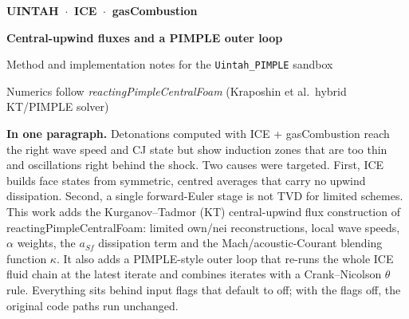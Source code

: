 \documentclass[11pt]{article}
\begin{document}
\thispagestyle{empty}
\vspace*{-6mm}
\begingroup\color{white}\sffamily\raggedright
  {\small\bfseries UINTAH \,$\cdot$\, ICE \,$\cdot$\, gasCombustion\par}
  \vspace{5mm}
  {\LARGE\bfseries Central-upwind fluxes and a PIMPLE outer loop\par}
  \vspace{3mm}
  {\large Method and implementation notes for the \texttt{Uintah\_PIMPLE} sandbox\par}
  \vspace{2mm}
  {\small Numerics follow \emph{reactingPimpleCentralFoam} (Kraposhin et al.\ hybrid KT/PIMPLE solver)\par}
\endgroup
\vspace{20mm}

\begin{keypoint}
\textbf{\sffamily\color{Ink}In one paragraph.}
Detonations computed with ICE + gasCombustion reach the right wave speed and CJ state but
show induction zones that are too thin and oscillations right behind the shock. Two
causes were targeted. First, ICE builds face states from symmetric, centred averages that
carry no upwind dissipation. Second, a single forward-Euler stage is not TVD for limited
schemes. This work adds the Kurganov--Tadmor (KT) central-upwind flux construction of
reactingPimpleCentralFoam: limited own/nei reconstructions, local wave speeds, $\alpha$
weights, the $a_{Sf}$ dissipation term and the Mach/acoustic-Courant blending function
$\kappa$. It also adds a PIMPLE-style outer loop that re-runs the whole ICE fluid chain at
the latest iterate and combines iterates with a Crank--Nicolson $\theta$ rule. Everything
sits behind input flags that default to off; with the flags off, the original code paths
run unchanged.
\end{keypoint}

\tableofcontents
\newpage

\end{document}
